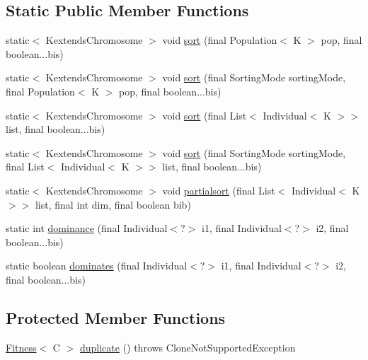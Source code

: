 \subsection*{Static Public Member Functions}
\begin{DoxyCompactItemize}
\item 
static$<$ Kextends\-Chromosome $>$ void \hyperlink{classjenes_1_1population_1_1_fitness_3_01_c_01extends_01_chromosome_01_4_a2601adaae23ba51f4f078b2e47bac2bf}{sort} (final Population$<$ K $>$ pop, final boolean...\-bis)
\item 
static$<$ Kextends\-Chromosome $>$ void \hyperlink{classjenes_1_1population_1_1_fitness_3_01_c_01extends_01_chromosome_01_4_a814eb910523f378522273a3fdd0cf1a6}{sort} (final Sorting\-Mode sorting\-Mode, final Population$<$ K $>$ pop, final boolean...\-bis)
\item 
static$<$ Kextends\-Chromosome $>$ void \hyperlink{classjenes_1_1population_1_1_fitness_3_01_c_01extends_01_chromosome_01_4_a160b6471e47adc4386c1dd4122a50e25}{sort} (final List$<$ Individual$<$ K $>$$>$ list, final boolean...\-bis)
\item 
static$<$ Kextends\-Chromosome $>$ void \hyperlink{classjenes_1_1population_1_1_fitness_3_01_c_01extends_01_chromosome_01_4_a351dc03eea62cdfb46b5dfe8e75b34cd}{sort} (final Sorting\-Mode sorting\-Mode, final List$<$ Individual$<$ K $>$$>$ list, final boolean...\-bis)
\item 
static$<$ Kextends\-Chromosome $>$ void \hyperlink{classjenes_1_1population_1_1_fitness_3_01_c_01extends_01_chromosome_01_4_abb440f362a2cd5578c25d2d8dd09a33f}{partialsort} (final List$<$ Individual$<$ K $>$$>$ list, final int dim, final boolean bib)
\item 
static int \hyperlink{classjenes_1_1population_1_1_fitness_3_01_c_01extends_01_chromosome_01_4_a40ee2060c7904075c6606c73f169e7b8}{dominance} (final Individual$<$?$>$ i1, final Individual$<$?$>$ i2, final boolean...\-bis)
\item 
static boolean \hyperlink{classjenes_1_1population_1_1_fitness_3_01_c_01extends_01_chromosome_01_4_a86b15569d72a9b78c7324ee344ef3dcd}{dominates} (final Individual$<$?$>$ i1, final Individual$<$?$>$ i2, final boolean...\-bis)
\end{DoxyCompactItemize}
\subsection*{Protected Member Functions}
\begin{DoxyCompactItemize}
\item 
\hyperlink{classjenes_1_1population_1_1_fitness_3_01_c_01extends_01_chromosome_01_4_aba60bd43d62c74ca35946ce9c75bff8f}{Fitness}$<$ C $>$ \hyperlink{classjenes_1_1population_1_1_fitness_3_01_c_01extends_01_chromosome_01_4_acea9db9e50fbde7132dc1de0c3baa641}{duplicate} ()  throws Clone\-Not\-Supported\-Exception 
\end{DoxyCompactItemize}


